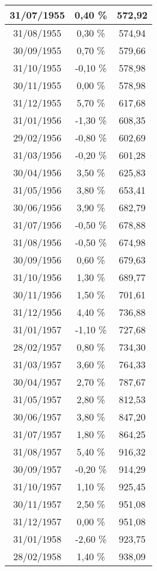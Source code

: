 \begin{center}
\begin{longtable}{|c|c|c|}
31/07/1955 & 0,40 \% & 572,92  \\ \hline
31/08/1955 & 0,30 \% & 574,94  \\ \hline
30/09/1955 & 0,70 \% & 579,66  \\ \hline
31/10/1955 & -0,10 \% & 578,98  \\ \hline
30/11/1955 & 0,00 \% & 578,98  \\ \hline
31/12/1955 & 5,70 \% & 617,68  \\ \hline
31/01/1956 & -1,30 \% & 608,35  \\ \hline
29/02/1956 & -0,80 \% & 602,69  \\ \hline
31/03/1956 & -0,20 \% & 601,28  \\ \hline
30/04/1956 & 3,50 \% & 625,83  \\ \hline
31/05/1956 & 3,80 \% & 653,41  \\ \hline
30/06/1956 & 3,90 \% & 682,79  \\ \hline
31/07/1956 & -0,50 \% & 678,88  \\ \hline
31/08/1956 & -0,50 \% & 674,98  \\ \hline
30/09/1956 & 0,60 \% & 679,63  \\ \hline
31/10/1956 & 1,30 \% & 689,77  \\ \hline
30/11/1956 & 1,50 \% & 701,61  \\ \hline
31/12/1956 & 4,40 \% & 736,88  \\ \hline
31/01/1957 & -1,10 \% & 727,68  \\ \hline
28/02/1957 & 0,80 \% & 734,30  \\ \hline
31/03/1957 & 3,60 \% & 764,33  \\ \hline
30/04/1957 & 2,70 \% & 787,67  \\ \hline
31/05/1957 & 2,80 \% & 812,53  \\ \hline
30/06/1957 & 3,80 \% & 847,20  \\ \hline
31/07/1957 & 1,80 \% & 864,25  \\ \hline
31/08/1957 & 5,40 \% & 916,32  \\ \hline
30/09/1957 & -0,20 \% & 914,29  \\ \hline
31/10/1957 & 1,10 \% & 925,45  \\ \hline
30/11/1957 & 2,50 \% & 951,08  \\ \hline
31/12/1957 & 0,00 \% & 951,08  \\ \hline
31/01/1958 & -2,60 \% & 923,75  \\ \hline
28/02/1958 & 1,40 \% & 938,09  \\ \hline

\end{longtable}
\end{center}
